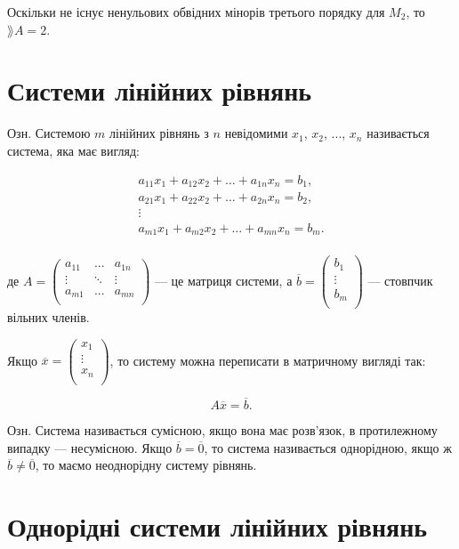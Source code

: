 Оскільки не існує ненульових обвідних мінорів третього порядку для $M_2$, то
$\rang A = 2$.

\section{Системи лінійних рівнянь}

Озн. Системою $m$ лінійних рівнянь з $n$ невідомими $x_1$, $x_2$, ..., $x_n$ називається
система, яка має вигляд:

$$\begin{array}{l}
	a_{11} x_1 + a_{12} x_2 + ... + a_{1n} x_n = b_1, \\
	a_{21} x_1 + a_{22} x_2 + ... + a_{2n} x_n = b_2, \\
	\vdots \\
	a_{m1} x_1 + a_{m2} x_2 + ... + a_{mn} x_n = b_m. \\
\end{array}$$

де $A = \begin{pmatrix}
	a_{11} & ...    & a_{1n} \\
	\vdots & \ddots & \vdots \\
	a_{m1} & ...    & a_{mn} \\
\end{pmatrix}$ --- це матриця системи, а $\overline{b} = \begin{pmatrix}
	b_1 \\
	\vdots \\	
	b_m \\
\end{pmatrix}$ --- стовпчик вільних членів.


Якщо $\overline{x} = \begin{pmatrix}
	x_1 \\
	\vdots \\	
	x_n \\
\end{pmatrix}$, то систему можна переписати в матричному вигляді так:

$$ A \overline{x} =  \overline{b}.$$


Озн. Система називається сумісною, якщо вона має розв’язок, в
протилежному випадку --- несумісною. Якщо $\overline{b} = \overline{0}$, то система називається
однорідною, якщо ж $\overline{b} \neq \overline{0}$, то маємо неоднорідну систему рівнянь.

\section{Однорідні системи лінійних рівнянь}


